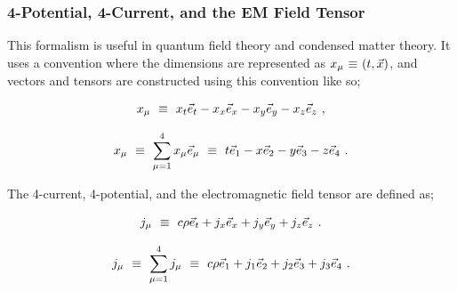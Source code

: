 \documentclass{article}
\begin{document}
\subsubsection{4-Potential, 4-Current, and the EM Field Tensor}

This formalism is useful in quantum field theory and condensed matter theory. It uses a convention where the dimensions are represented as \begin{math} x_{\mu} \hspace{0.025cm} \equiv \hspace{0.025cm} ( t, \vec{x} ) \end{math}, and vectors and tensors are constructed using this convention like so;

\begin{equation} \label{eq:1002}
x_{\mu} \hspace{0.125cm} \equiv \hspace{0.125cm} x_t \vec{e}_t - x_x \vec{e}_x - x_y \vec{e}_y - x_z \vec{e}_z \hspace{0.125cm} ,
\end{equation}

\begin{equation} \label{eq:1002}
x_{\mu} \hspace{0.125cm} \equiv \hspace{0.125cm} \sum_{\mu = 1}^{4} x_{\mu} \vec{e}_{\mu} \hspace{0.125cm} \equiv \hspace{0.125cm} t \vec{e}_1 - x \vec{e}_2 - y \vec{e}_3 - z \vec{e}_4 \hspace{0.125cm} .
\end{equation}

The 4-current, 4-potential, and the electromagnetic field tensor are defined as;

\begin{equation} \label{eq:1002}
j_{\mu} \hspace{0.125cm} \equiv \hspace{0.125cm} c \rho \vec{e}_t + j_x \vec{e}_x + j_y \vec{e}_y + j_z \vec{e}_z \hspace{0.125cm} .
\end{equation}

\begin{equation} \label{eq:1002}
j_{\mu} \hspace{0.125cm} \equiv \hspace{0.125cm} \sum_{\mu = 1}^{4} j_{\mu} \hspace{0.125cm} \equiv \hspace{0.125cm} c \rho \vec{e}_1 + j_1 \vec{e}_2 + j_2 \vec{e}_3 + j_3 \vec{e}_4 \hspace{0.125cm} .
\end{equation}
\end{document}

